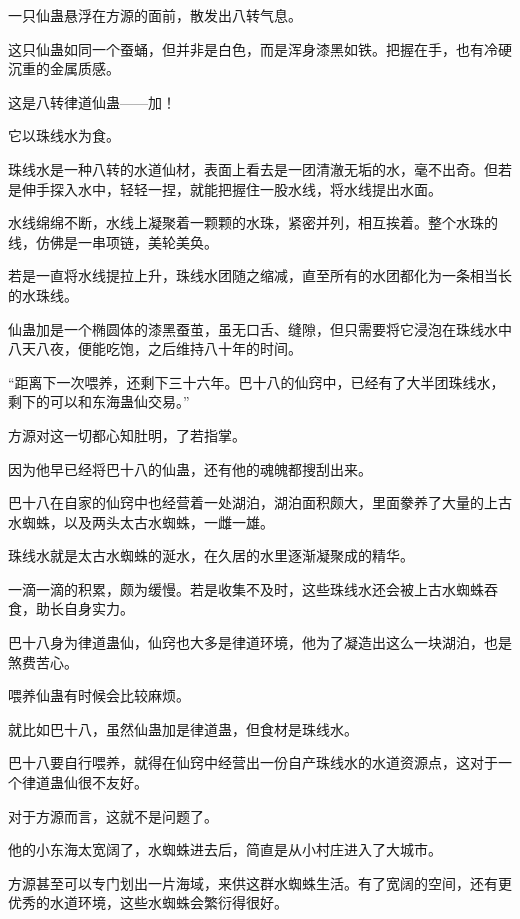 
\begin{this_body}

一只仙蛊悬浮在方源的面前，散发出八转气息。

这只仙蛊如同一个蚕蛹，但并非是白色，而是浑身漆黑如铁。把握在手，也有冷硬沉重的金属质感。

这是八转律道仙蛊——加！

它以珠线水为食。

珠线水是一种八转的水道仙材，表面上看去是一团清澈无垢的水，毫不出奇。但若是伸手探入水中，轻轻一捏，就能把握住一股水线，将水线提出水面。

水线绵绵不断，水线上凝聚着一颗颗的水珠，紧密并列，相互挨着。整个水珠的线，仿佛是一串项链，美轮美奂。

若是一直将水线提拉上升，珠线水团随之缩减，直至所有的水团都化为一条相当长的水珠线。

仙蛊加是一个椭圆体的漆黑蚕茧，虽无口舌、缝隙，但只需要将它浸泡在珠线水中八天八夜，便能吃饱，之后维持八十年的时间。

“距离下一次喂养，还剩下三十六年。巴十八的仙窍中，已经有了大半团珠线水，剩下的可以和东海蛊仙交易。”

方源对这一切都心知肚明，了若指掌。

因为他早已经将巴十八的仙蛊，还有他的魂魄都搜刮出来。

巴十八在自家的仙窍中也经营着一处湖泊，湖泊面积颇大，里面豢养了大量的上古水蜘蛛，以及两头太古水蜘蛛，一雌一雄。

珠线水就是太古水蜘蛛的涎水，在久居的水里逐渐凝聚成的精华。

一滴一滴的积累，颇为缓慢。若是收集不及时，这些珠线水还会被上古水蜘蛛吞食，助长自身实力。

巴十八身为律道蛊仙，仙窍也大多是律道环境，他为了凝造出这么一块湖泊，也是煞费苦心。

喂养仙蛊有时候会比较麻烦。

就比如巴十八，虽然仙蛊加是律道蛊，但食材是珠线水。

巴十八要自行喂养，就得在仙窍中经营出一份自产珠线水的水道资源点，这对于一个律道蛊仙很不友好。

对于方源而言，这就不是问题了。

他的小东海太宽阔了，水蜘蛛进去后，简直是从小村庄进入了大城市。

方源甚至可以专门划出一片海域，来供这群水蜘蛛生活。有了宽阔的空间，还有更优秀的水道环境，这些水蜘蛛会繁衍得很好。


\end{this_body}

